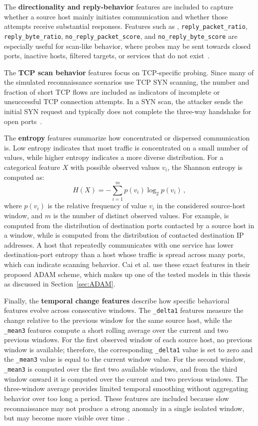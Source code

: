 The \textbf{directionality and reply-behavior} features are included to capture whether a source host mainly initiates communication and whether those attempts receive substantial responses. Features such as , \texttt{reply\_packet\_ratio}, \texttt{reply\_byte\_ratio}, \texttt{no\_reply\_packet\_score}, and \texttt{no\_reply\_byte\_score} are especially useful for scan-like behavior, where probes may be sent towards closed ports, inactive hosts, filtered targets, or services that do not exist~\cite{ring_detection_2018}.

The \textbf{TCP scan behavior} features focus on TCP-specific probing. Since many of the simulated reconnaissance scenarios use TCP SYN scanning, the number and fraction of short TCP flows are included as indicators of incomplete or unsuccessful TCP connection attempts. In a SYN scan, the attacker sends the initial SYN request and typically does not complete the three-way handshake for open ports~\cite{ring_detection_2018}.

The \textbf{entropy} features summarize how concentrated or dispersed communication is. Low entropy indicates that most traffic is concentrated on a small number of values, while higher entropy indicates a more diverse distribution. For a categorical feature $X$ with possible observed values $v_i$, the Shannon entropy is computed as:
\[
H(X) = - \sum_{i=1}^{m} p(v_i)\log_2 p(v_i)\, ,
\]
where $p(v_i)$ is the relative frequency of value $v_i$ in the considered source-host window, and $m$ is the number of distinct observed values. For example,  is computed from the distribution of destination ports contacted by a source host in a window, while  is computed from the distribution of contacted destination IP addresses. A host that repeatedly communicates with one service has lower destination-port entropy than a host whose traffic is spread across many ports, which can indicate scanning behavior. Cai et al. use these exact features in their proposed ADAM scheme, which makes up one of the tested models in this thesis as discussed in Section~\ref{sec:ADAM}.

Finally, the \textbf{temporal change features} describe how specific behavioral features evolve across consecutive windows. The \texttt{\_delta1} features measure the change relative to the previous window for the same source host, while the \texttt{\_mean3} features compute a short rolling average over the current and two previous windows. For the first observed window of each source host, no previous window is available; therefore, the corresponding \texttt{\_delta1} value is set to zero and the \texttt{\_mean3} value is equal to the current window value. For the second window, \texttt{\_mean3} is computed over the first two available windows, and from the third window onward it is computed over the current and two previous windows. The three-window average provides limited temporal smoothing without aggregating behavior over too long a period. These features are included because slow reconnaissance may not produce a strong anomaly in a single isolated window, but may become more visible over time~\cite{ring_detection_2018}.


